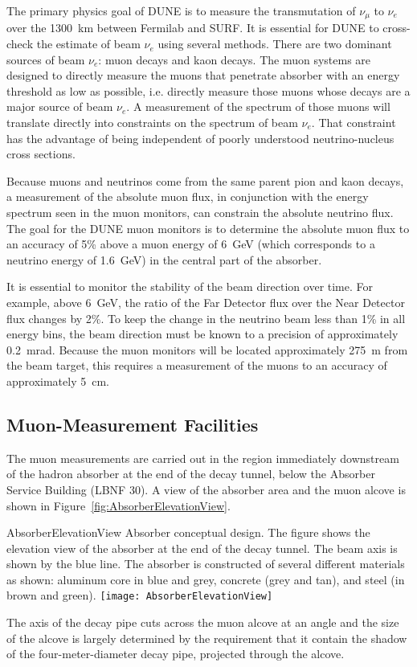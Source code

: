 The primary physics goal of DUNE is to measure the transmutation
of $\nu_\mu$ to $\nu_e$ over the 1300~km between Fermilab
and SURF. It is essential for DUNE to cross-check the estimate of 
beam $\nu_e$ using several methods.
There are two dominant sources of beam $\nu_e$: muon decays and kaon decays. 
The muon systems are designed to directly measure the 
muons that penetrate absorber with an energy 
threshold as low as possible, i.e. directly measure those muons 
whose decays are a major source of beam $\nu_e$. 
A measurement of the spectrum of those muons will translate
 directly into constraints on the spectrum of beam $\nu_e$.
That constraint has the advantage of being independent of poorly understood 
neutrino-nucleus cross sections.

Because muons and neutrinos come from the same parent pion and kaon
decays, a measurement of the absolute muon flux, in conjunction with the energy spectrum
seen in the muon monitors, can constrain the absolute neutrino flux.  
The goal for the DUNE muon monitors is to determine the absolute muon flux
to an accuracy of 5\% above a muon energy of 6~GeV (which corresponds to
a neutrino energy of 1.6~GeV) in the central part of the absorber.

It is essential to monitor the stability of the beam direction over
time. For example, above 6~GeV, the ratio of the Far Detector flux over 
the Near Detector flux changes by 2\%.  
To keep the change in the neutrino beam less than 1\% in all energy bins,
the beam direction must be known to a precision of approximately 0.2~mrad. 
Because the muon monitors will be located approximately 275~m
from the beam target, this requires a measurement of the muons to an
accuracy of approximately 5~cm.

%
%
\subsection{Muon-Measurement Facilities}
\label{subsec:detectors-nd-blm-muon-measurement-facilities}

The muon measurements are carried out in the region immediately
downstream of the hadron absorber at the end of the decay tunnel, below
the Absorber Service Building (LBNF 30).  A view of the absorber area
and the muon alcove is shown in Figure~\ref{fig:AbsorberElevationView}.  
\begin{cdrfigure}{AbsorberElevationView}
{Absorber conceptual design. The figure shows the elevation view of the 
absorber at the end of the decay tunnel. The beam axis is shown by
the blue line. The absorber is constructed of several different 
materials as shown: aluminum core in blue and grey, concrete 
(grey and tan), and steel (in brown and green).}
\texttt{[image: AbsorberElevationView]}
\end{cdrfigure}
The axis of the decay pipe
cuts across the muon alcove at an angle and the size of the alcove is
largely determined by the requirement that it contain the shadow of
the four-meter-diameter decay pipe, projected through the alcove.

